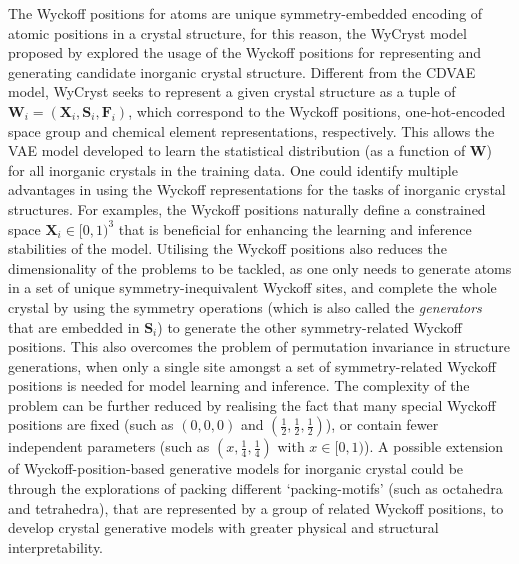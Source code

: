 The Wyckoff positions for atoms  are unique symmetry-embedded encoding of atomic positions in a crystal structure, for this reason, the WyCryst model proposed by \citet{zhu2024wycryst} explored the usage of the  Wyckoff positions for representing and generating candidate inorganic crystal structure. Different from the CDVAE model, WyCryst seeks to represent a given crystal structure as a tuple of $\bm{W}_i=(\bm{X}_i,\bm{S}_i,\bm{F}_i)$, which correspond to the Wyckoff positions, one-hot-encoded space group and chemical element representations, respectively. This allows the VAE model developed to learn the statistical distribution (as a function of $\bm{W}$) for all inorganic crystals in the training data. One could identify multiple advantages in using the Wyckoff representations for the tasks of inorganic crystal structures. For examples, the Wyckoff positions naturally define a constrained space $\bm{X}_i\in[0,1)^3$ that is beneficial for enhancing the learning and inference stabilities of the model. Utilising the Wyckoff positions also reduces the dimensionality of the problems to be tackled, as one only needs to generate atoms in a set of unique symmetry-inequivalent Wyckoff sites, and complete the whole crystal by using the symmetry operations (which is also called the \emph{generators} that are embedded in $\bm{S}_i$) to generate the other symmetry-related Wyckoff positions. This also overcomes the problem of permutation invariance in structure generations, when only a single site amongst a set of symmetry-related Wyckoff positions is needed for model learning and inference. The complexity of the problem can be further reduced  by realising the fact that many special Wyckoff positions are fixed (such as $(0,0,0)$ and $(\frac{1}{2},\frac{1}{2},\frac{1}{2})$), or contain fewer independent parameters (such as $(x,\frac{1}{4},\frac{1}{4})$ with $x\in[0,1)$). A possible extension of Wyckoff-position-based generative models for inorganic crystal could be through the explorations of packing different `packing-motifs' (such as octahedra and tetrahedra), that are represented by a group of related Wyckoff positions, to develop crystal generative models with greater physical and structural interpretability. 

